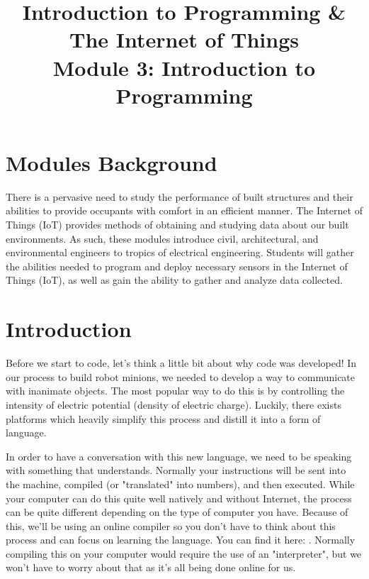 \documentclass[a4paper]{article}
\title{ \textbf{Introduction to Programming \& The Internet of Things} \\
Module 3: Introduction to Programming \vspace{-5ex} \\
}
\date{}
\begin{document}
\maketitle
\thispagestyle{fancy}

\section{Modules Background}
There is a pervasive need to study the performance of built structures and their abilities to provide occupants with comfort in an efficient manner. The Internet of Things (IoT) provides methods of obtaining and studying data about our built environments. As such, these modules introduce civil, architectural, and environmental engineers to tropics of electrical engineering. Students will gather the abilities needed to program and deploy necessary sensors in the Internet of Things (IoT), as well as gain the ability to gather and analyze data collected.

\tableofcontents
\newpage

\section{Introduction}
\label{sec:introduction}

Before we start to code, let's think a little bit about why code was developed! In our process to build robot minions, we needed to develop a way to communicate with inanimate objects. The most popular way to do this is by controlling the intensity of electric potential (density of electric charge). Luckily, there exists platforms which heavily simplify this process and distill it into a form of language.

In order to have a conversation with this new language, we need to be speaking with something that understands. Normally your instructions will be sent into the machine, compiled (or "translated" into numbers), and then executed. While your computer can do this quite well natively and without Internet, the process can be quite different depending on the type of computer you have. Because of this, we'll be using an online compiler so you don't have to think about this process and can focus on learning the language. You can find it here: \cite{cpp}. Normally compiling this on your computer would require the use of an "interpreter", but we won't have to worry about that as it's all being done online for us.
\end{document}
